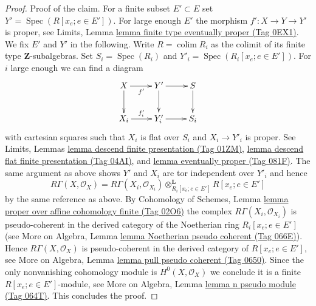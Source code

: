 \documentclass{amsart}
\theoremstyle{plain}
\theoremstyle{definition}
\theoremstyle{remark}
\numberwithin{equation}{subsection}
\def\colim{\mathop{\mathrm{colim}}\nolimits}
\def\Spec{\mathop{\mathrm{Spec}}}
\begin{document}
\begin{proof}
\medskip\noindent
Proof of the claim.
For a finite subset $E' \subset E$ set $Y' = \Spec(R[x_e; e \in E'])$.
For large enough $E'$ the morphism $f' : X \to Y \to Y'$ is proper, see
Limits, Lemma \href{https://stacks.math.columbia.edu/tag/0EX1}{lemma finite type eventually proper (Tag 0EX1)}.
We fix $E'$ and $Y'$ in the following.
Write $R = \colim R_i$ as the colimit of its finite type
$\mathbf{Z}$-subalgebras. Set $S_i = \Spec(R_i)$
and $Y'_i = \Spec(R_i[x_e; e \in E'])$.
For $i$ large enough we can find a diagram
$$
\xymatrix{
X \ar[d] \ar[r]_{f'} & Y' \ar[d] \ar[r] & S \ar[d] \\
X_i \ar[r]^{f'_i} & Y'_i \ar[r] & S_i
}
$$
with cartesian squares such that $X_i$ is flat over $S_i$ and
$X_i \to Y'_i$ is proper. See
Limits, Lemmas \href{https://stacks.math.columbia.edu/tag/01ZM}{lemma descend finite presentation (Tag 01ZM)},
\href{https://stacks.math.columbia.edu/tag/04AI}{lemma descend flat finite presentation (Tag 04AI)}, and
\href{https://stacks.math.columbia.edu/tag/081F}{lemma eventually proper (Tag 081F)}.
The same argument as above shows $Y'$ and $X_i$
are tor independent over $Y'_i$ and hence
$$
R\Gamma(X, \mathcal{O}_X) =
R\Gamma(X_i, \mathcal{O}_{X_i})
\otimes^\mathbf{L}_{R_i[x_e; e \in E']}
R[x_e; e \in E']
$$
by the same reference as above. By Cohomology of Schemes, Lemma
\href{https://stacks.math.columbia.edu/tag/02O6}{lemma proper over affine cohomology finite (Tag 02O6)}
the complex $R\Gamma(X_i, \mathcal{O}_{X_i})$ is pseudo-coherent
in the derived category of the Noetherian ring $R_i[x_e; e \in E']$ (see
More on Algebra, Lemma \href{https://stacks.math.columbia.edu/tag/066E}{lemma Noetherian pseudo coherent (Tag 066E)}).
Hence $R\Gamma(X, \mathcal{O}_X)$ is pseudo-coherent in the derived
category of $R[x_e; e \in E']$, see
More on Algebra, Lemma \href{https://stacks.math.columbia.edu/tag/0650}{lemma pull pseudo coherent (Tag 0650)}.
Since the only nonvanishing cohomology module
is $H^0(X, \mathcal{O}_X)$ we conclude it is a finite
$R[x_e; e \in E']$-module, see
More on Algebra, Lemma \href{https://stacks.math.columbia.edu/tag/064T}{lemma n pseudo module (Tag 064T)}.
This concludes the proof.
\end{proof}
\end{document}

